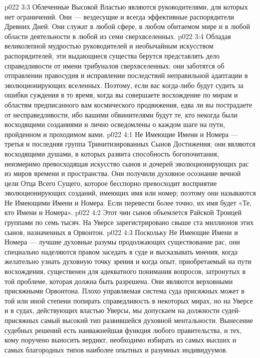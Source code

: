 \vs p022 3:3 Облеченные Высокой Властью являются руководителями, для которых нет ограничений. Они --- вездесущие и всегда эффективные распорядители Древних Дней. Они служат в любой сфере, в любом обитаемом мире и в любой области деятельности в любой из семи сверхвселенных.
\vs p022 3:4 Обладая великолепной мудростью руководителей и необычайным искусством распорядителей, эти выдающиеся существа берутся представлять дело справедливости от имени трибуналов сверхвселенных; они заботятся об отправлении правосудия и исправлении последствий неправильной адаптации в эволюционирующих вселенных. Поэтому, если вас когда\hyp{}либо будут судить за ошибки суждения в то время, когда вы совершаете восхождение по мирам и областям предписанного вам космического продвижения, едва ли вы пострадаете от несправедливости, ибо вашими обвинителями будут те, кто некогда были восходящими созданиями и лично осведомлены о каждом шаге на пути, пройденном и проходимом вами.
\vs p022 4:1 Не Имеющие Имени и Номера --- третья и последняя группа Тринитизированных Сынов Достижения; они являются восходящими душами, в которых развита способность богопочитания, неизмеримо превосходящая искусство сынов и дочерей эволюционирующих рас из миров времени и пространства. Они получили духовное осознание вечной цели Отца Всего Сущего, которое бесспорно превосходит восприятие эволюционирующих созданий, имеющих имя или номер; поэтому они называются Не Имеющими Имени и Номера. Если перевести более точно, их имя будет «Те, кто  Имени и Номера».
\vs p022 4:2 Этот чин сынов объемлется Райской Троицей группами по семь тысяч. На Уверсе зарегистрировано свыше ста миллионов этих сынов, назначенных в Орвонтон.
\vs p022 4:3 Поскольку Не Имеющие Имени и Номера --- лучшие духовные разумы продолжающих существование рас, они специально наделяются правом заседать в суде и высказывать мнения, когда желательно узнать духовную точку зрения и когда опыт, приобретаемый на пути восхождения, существенен для адекватного понимания вопросов, затронутых в той проблеме, которая должна быть разрешена. Они являются верховными присяжными Орвонтона. Плохо управляемая система суда присяжных может в той или иной степени попирать справедливость в некоторых мирах, но на Уверсе и в судах, действующих властью Уверсы, мы допускаем на должности судей\hyp{}присяжных самый высокий тип развившейся духовной ментальности. Вынесение судебных решений есть наиважнейшая функция любого правительства, и тех, кому поручено выносить вердикт, необходимо избирать из самых высших и самых благородных типов наиболее опытных и разумных индивидуумов.
